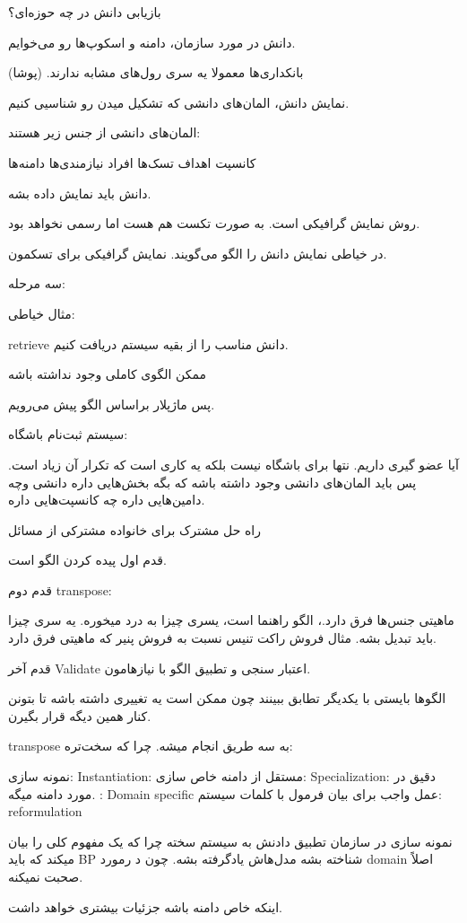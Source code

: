 بازیابی دانش در چه حوزه‌ای؟

دانش در مورد سازمان، دامنه و اسکوپ‌ها رو می‌خوایم.

بانکداری‌ها معمولا یه سری رول‌های مشابه ندارند. (پوشا)

نمایش دانش، المان‌های دانشی که تشکیل میدن رو شناسیی کنیم. 

المان‌های دانشی از جنس زیر هستند:

کانسپت
اهداف
تسک‌ها
افراد
نیازمندی‌ها
دامنه‌ها

دانش باید نمایش داده بشه. 

روش نمایش گرافیکی است. به صورت تکست هم هست اما رسمی نخواهد بود.

در خیاطی نمایش دانش را الگو می‌گویند. نمایش گرافیکی برای تسکمون.

سه مرحله:

مثال خیاطی:

retrieve
دانش مناسب را از بقیه سیستم دریافت کنیم.

ممکن الگوی کاملی وجود نداشته باشه

پس ماژپلار براساس الگو پیش می‌رویم.

سیستم ثبت‌نام باشگاه:

آیا عضو گیری داریم. نتها برای باشگاه نیست بلکه یه کاری است که تکرار آن زیاد است.
پس باید المان‌های دانشی وجود داشته باشه که بگه بخش‌هایی داره دانشی وچه
دامین‌هایی داره چه کانسپت‌هایی داره.

راه حل مشترک برای خانواده مشترکی از مسائل

قدم اول پیده کردن الگو است.

قدم دوم transpose:

ماهیتی جنس‌ها فرق دارد.، الگو راهنما است، یسری چیزا به درد میخوره. یه سری چیزا
باید تبدیل بشه. مثال فروش راکت تنیس نسبت به فروش پنیر که ماهیتی فرق دارد.

قدم آخر Validate اعتبار سنجی و تطبیق الگو با نیاز‌هامون.

الگو‌ها بایستی با یکدیگر تطابق ببینند چون ممکن است یه تغییری داشته باشه تا بتونن
کنار همین دیگه قرار بگیرن.


transpose به سه طریق انجام میشه. چرا که سخت‌تره:

نمونه سازی: Instantiation: مستقل از دامنه
خاص سازی: Specialization: دقیق در مورد دامنه میگه. : Domain specific
عمل واجب برای بیان فرمول با کلمات سیستم: reformulation

نمونه سازی در سازمان تطبیق دادنش به سیستم سخته چرا که یک مفهوم کلی را بیان میکند
که باید BP شناخته بشه مدل‌هاش یادگرفته بشه. چون د رمورد domain اصلاً صحبت
نمیکنه.

اینکه خاص دامنه باشه جزئیات بیشتری خواهد داشت.

